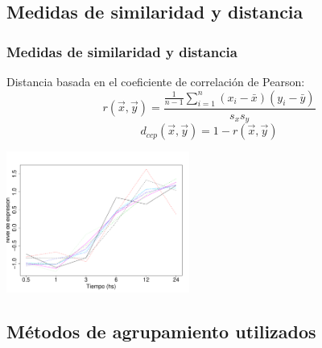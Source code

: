 \documentclass[serif,9pt, t]{beamer}
\begin{document}
\subsection{Medidas de similaridad y distancia}
\begin{frame} \frametitle{Medidas de similaridad y distancia} 
\centering
	Distancia basada en el coeficiente de correlación de Pearson:\\
	\begin{equation}
		r(\vec{x}, \vec{y}) = \frac{\frac{1}{n-1}\sum\limits_{i=1}^n(x_i-\bar{x})(y_i-\bar{y})}{s_x s_y}
	\end{equation}
	\begin{equation}
		d_{ccp}(\vec{x}, \vec{y}) = 1-r(\vec{x}, \vec{y})
	\end{equation}

	\centering	
	\includegraphics[width=0.45\textwidth]{perfiles_coregulados.pdf}

\end{frame}

\subsection{Métodos de agrupamiento utilizados}
\end{document}
